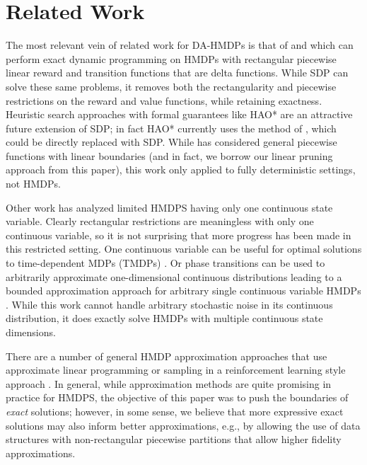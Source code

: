 \documentclass[twoside,11pt]{article}
\begin{document}
\section{Related Work}

The most relevant vein of related work for DA-HMDPs is that of \cite{feng04} and \cite{li05} which can perform exact dynamic programming on
HMDPs with rectangular piecewise linear reward and transition functions
that are delta functions.  While SDP can solve these same problems,
it removes both the rectangularity and piecewise restrictions on the
reward and value functions, while retaining exactness.  
Heuristic search approaches with formal guarantees 
like HAO* \cite{hao09} are an attractive future extension of SDP;
in fact HAO* currently uses the method of \cite{feng04}, which could
be directly replaced with SDP.  While \cite{penberthy94} has considered
general piecewise functions with linear boundaries (and in fact,
we borrow our linear pruning approach from this paper), this work
only applied to fully deterministic settings, not HMDPs.

Other work has analyzed limited HMDPS having only one continuous
state variable.  Clearly rectangular restrictions are meaningless with
only one continuous variable, so it is not surprising that more
progress has been made in this restricted setting.  One continuous
variable can be useful for optimal solutions to time-dependent MDPs 
(TMDPs) \cite{boyan01}.  Or phase transitions can be used to 
arbitrarily approximate one-dimensional continuous distributions
leading to a bounded approximation approach for arbitrary single continuous
variable HMDPs \cite{phase07}.  
While this work cannot handle arbitrary stochastic
noise in its continuous distribution, it does exactly solve HMDPs
with multiple continuous state dimensions.

There are a number of general HMDP approximation
approaches that use approximate linear programming \cite{kveton06}
or sampling in a reinforcement learning style approach \cite{munos02}.
In general, while approximation methods are quite promising in
practice for HMDPS, the objective of this paper was to push
the boundaries of \emph{exact} solutions; however, in some sense, 
we believe that more expressive exact solutions may also inform
better approximations, e.g., by allowing the use of data structures
with non-rectangular piecewise partitions that allow higher fidelity
approximations.
\end{document}
